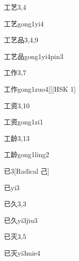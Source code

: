 \begin{entry}{工艺}{3,4}
  \begin{phonetics}{工艺}{gong1yi4}
  \end{phonetics}
\end{entry}

\begin{entry}{工艺品}{3,4,9}
  \begin{phonetics}{工艺品}{gong1yi4pin3}
  \end{phonetics}
\end{entry}

\begin{entry}{工作}{3,7}
  \begin{phonetics}{工作}{gong1zuo4}[][HSK 1]
  \end{phonetics}
\end{entry}

\begin{entry}{工资}{3,10}
  \begin{phonetics}{工资}{gong1zi1}
  \end{phonetics}
\end{entry}

\begin{entry}{工龄}{3,13}
  \begin{phonetics}{工龄}{gong1ling2}
  \end{phonetics}
\end{entry}

\begin{entry}{已}{3}[Radical 己]
  \begin{phonetics}{已}{yi3}
  \end{phonetics}
\end{entry}

\begin{entry}{已久}{3,3}
  \begin{phonetics}{已久}{yi3jiu3}
  \end{phonetics}
\end{entry}

\begin{entry}{已灭}{3,5}
  \begin{phonetics}{已灭}{yi3mie4}
  \end{phonetics}
\end{entry}

